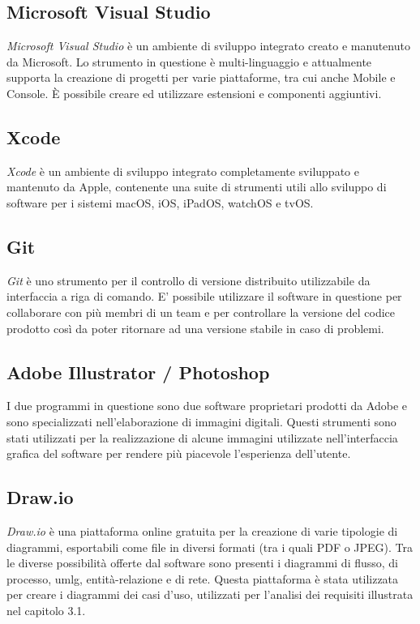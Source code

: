 \subsection*{Microsoft Visual Studio}
\textit{Microsoft Visual Studio} è un ambiente di sviluppo integrato creato e manutenuto da Microsoft. Lo strumento in questione è multi-linguaggio e attualmente supporta la creazione di progetti per varie piattaforme, tra cui anche Mobile e Console. È possibile creare ed utilizzare estensioni e componenti aggiuntivi.

\subsection*{Xcode}
\textit{Xcode} è un ambiente di sviluppo integrato completamente sviluppato e mantenuto da Apple, contenente una suite di strumenti utili allo sviluppo di software per i sistemi macOS, iOS, iPadOS, watchOS e tvOS. 

\subsection*{Git}
\textit{Git} è uno strumento per il controllo di versione distribuito utilizzabile da interfaccia a riga di comando. E' possibile utilizzare il software in questione per collaborare con più membri di un team e per controllare la versione del codice prodotto così da poter ritornare ad una versione stabile in caso di problemi.

\subsection*{Adobe Illustrator / Photoshop}
I due programmi in questione sono due software proprietari prodotti da Adobe e sono specializzati nell'elaborazione di immagini digitali. Questi strumenti sono stati utilizzati per la realizzazione di alcune immagini utilizzate nell'interfaccia grafica del software per rendere più piacevole l'esperienza dell'utente.

\subsection*{Draw.io}
\textit{Draw.io} è una piattaforma online gratuita per la creazione di varie tipologie di diagrammi, esportabili come file in diversi formati (tra i quali PDF o JPEG). Tra le diverse possibilità offerte  dal software sono presenti i diagrammi di flusso, di processo, \gls{umlg}, entità-relazione e di rete. Questa piattaforma è stata utilizzata per creare i diagrammi dei casi d'uso, utilizzati per l'analisi dei requisiti illustrata nel capitolo 3.1.

